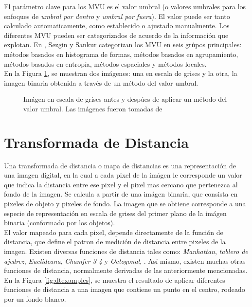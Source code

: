 El par\'ametro clave para los MVU es el valor umbral (o valores umbrales para los enfoques de
\emph{umbral por dentro} y \emph{umbral por fuera}). El valor puede ser tanto calculado
automaticamente, como establecido o ajustado manualmente. Los diferentes MVU pueden ser categorizados 
de acuerdo de la informaci\'on que explotan. En \cite[p.147]{thres}, Sezgin y Sankur
categorizan los MVU en seis gr\'upos principales: m\'etodos basados en histograma de formas,  
m\'etodos basados en agrupamiento, m\'etodos basados en entrop\'ia, m\'etodos espaciales y
m\'etodos locales.\\

En la Figura \ref{fig:thres1}, se muestran dos im\'agenes: una en escala de grises y la 
otra, la imagen binaria obtenida a trav\'es de un m\'etodo del valor umbral.

\begin{figure}[h t b p ! H]
  \centering
\qquad
  \caption[Im\'agen en escala de grises antes y desp\'ues de aplicar un m\'etodo del valor umbral ]{Im\'agen en escala de grises antes y desp\'ues de 
    aplicar un m\'etodo del valor umbral. Las im\'agenes fueron tomadas de \cite{web:thresholding}}
  \label{fig:thres1}
\end{figure}

\section{Transformada de Distancia}
\label{sec:dt}

Una transformada de distancia o mapa de distancias es una representaci\'on de
una imagen digital, en la cual a cada pixel de la im\'agen le corresponde
un valor que indica la distancia entre ese pixel y el pixel mas cercano que pertenezca
al fondo de la imagen. Se calcula a partir de una im\'agen binaria, que consista
en pixeles de objeto y pixeles de fondo. La imagen que se obtiene corresponde a
una especie de representaci\'on en escala de grises del primer plano de la im\'agen
binaria (conformado por los objetos).\\
El valor mapeado para cada pixel, depende directamente de la funci\'on de distancia,
que define el patron de medici\'on de distancia entre pixeles de la imagen. Existen
diversas funciones de distancia tales como: \emph{Manhattan},
\emph{tablero de ajedrez}, \emph{Euclideana}, \emph{Chamfer 3-4} y \emph{Octogonal}, 
\cite[p.363]{dtresearch}. As\'i mismo, existen muchas otras funciones de
distancia, normalmente derivadas de las anteriormente mencionadas.
En la Figura \ref{fig:dtexamples}, se muestra el resultado de aplicar 
diferentes funciones de distancia a una imagen que contiene un punto en el centro,
rodeado por un fondo blanco.

